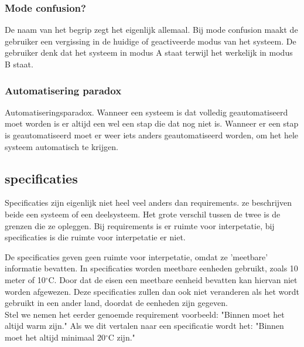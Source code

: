 \documentclass{article}%
\begin{document}
\subsubsection{Mode confusion?}
De naam van het begrip zegt het eigenlijk allemaal. Bij mode confusion maakt de gebruiker een vergissing in de huidige of geactiveerde modus van het systeem. De gebruiker denk dat het systeem in modus A staat terwijl het werkelijk in modus B staat. 

\subsubsection{Automatisering paradox}
Automatiseringsparadox. Wanneer een systeem is dat volledig geautomatiseerd moet worden is er altijd een wel een stap die dat nog niet is. Wanneer er een stap is geautomatiseerd moet er weer iets anders geautomatiseerd worden, om het hele systeem automatisch te krijgen.

\subsection{specificaties}
Specificaties zijn eigenlijk niet heel veel anders dan requirements. ze beschrijven beide een systeem of een deelsysteem. Het grote verschil tussen de twee is de grenzen die ze opleggen. Bij requirements is er ruimte voor interpetatie, bij specificaties is die ruimte voor interpetatie er niet.

De specificaties geven geen ruimte voor interpetatie, omdat ze 'meetbare' informatie bevatten. In specificaties worden meetbare eenheden gebruikt, zoals 10 meter of 10$^{\circ}$C. Door dat de eisen een meetbare eenheid bevatten kan hiervan niet worden afgewezen. Deze specificaties zullen dan ook niet veranderen als het wordt gebruikt in een ander land, doordat de eenheden zijn gegeven.
\\

Stel we nemen het eerder genoemde requirement voorbeeld: "Binnen moet het altijd warm zijn." Als we dit vertalen naar een specificatie wordt het: "Binnen moet het altijd minimaal 20$^{\circ}$C zijn."

\clearpage
\end{document}
